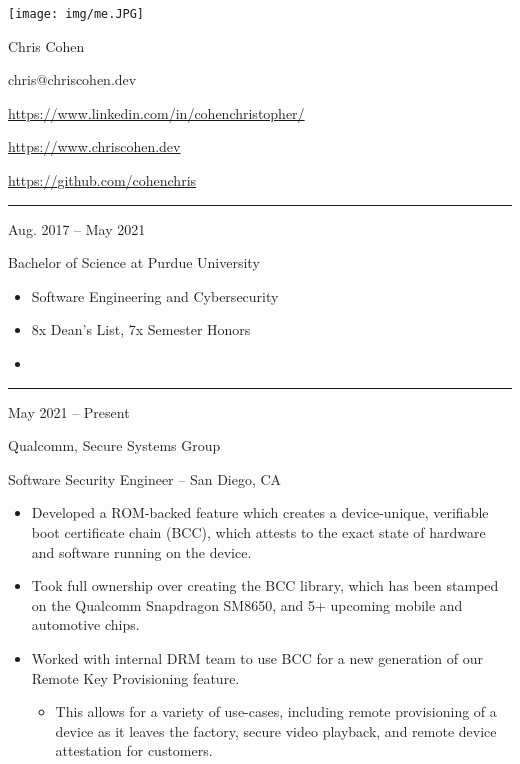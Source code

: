 \documentclass[a4paper]{article}
\newlength{\cvcolumngapwidth}
\newlength{\cvleftcolumnwidth}
\newlength{\cvrightcolumnwidth}
\newcommand{\cvnamestyle}[1]{{\Huge\cvnamefont\textcolor{cvnamecolor}{#1}}}
\newcommand{\cvsectionstyle}[1]{{\normalsize\cvsectionfont\textcolor{cvsectioncolor}{#1}}}
\newcommand{\cvtitlestyle}[1]{{\large\cvtitlefont\textcolor{cvtitlecolor}{#1}}}
\newcommand{\cvdurationstyle}[1]{{\small\cvdurationfont\textcolor{cvdurationcolor}{#1}}}
\newcommand{\italicstyle}[1]{{\small\italicfont\textcolor{cvsectioncolor}{#1}}}
\newlength{\cvafteritemskipamount}
\newlength{\cvaftersectionskipamount}
\newlength{\cvbeforesectionskipamount}
\newlength{\cvafternameskipamount}
\newlength{\cvafterpersonalinfolineskipamount}
\newlength{\cvaftertitleskipamount}
\newlength{\cvparskip}
\newcommand{\cvpersonalinfo}[2]{
    \begin{minipage}[t]{\cvleftcolumnwidth}
        \vspace{0mm} %
        \raggedleft #1
    \end{minipage}%
    \hspace{\cvcolumngapwidth}%
    \begin{minipage}[t]{\cvrightcolumnwidth}
        \vspace{0mm} %
        #2
    \end{minipage}

    \vspace{\cvafteritemskipamount}
}
\newcommand{\cvname}[1]{
    \cvnamestyle{#1}

    \vspace{\cvafternameskipamount}
}
\newcommand{\cvpersonalinfolinewithicon}[3]{
    \raisebox{.5\fontcharht\font`E-.5\height}{\texttt{[image: \#2]}}
    #3

    \vspace{\cvafterpersonalinfolineskipamount}
}
\newcommand{\cvsection}[1]{
    \vspace{\cvbeforesectionskipamount}

    \begin{minipage}[t]{\cvleftcolumnwidth}
        \raggedleft\cvsectionstyle{#1}
    \end{minipage}%
    \hspace{\cvcolumngapwidth}%
    \begin{minipage}[t]{\cvrightcolumnwidth}
        \textcolor{cvrulecolor}{\rule{\cvrightcolumnwidth}{0.3mm}}
    \end{minipage}

    \vspace{\cvaftersectionskipamount}
}
\newcommand{\cvitem}[2]{
    \begin{minipage}[t]{\cvleftcolumnwidth}
        \raggedleft #1
    \end{minipage}%
    \hspace{\cvcolumngapwidth}%
    \begin{minipage}[t]{\cvrightcolumnwidth}
        \setlength{\parskip}{\cvparskip} #2
    \end{minipage}

    \vspace{\cvafteritemskipamount}
}
\newcommand{\cvtitle}[1]{
    \cvtitlestyle{#1}

    \vspace{\cvaftertitleskipamount}
    \vspace{-\cvparskip}
}
\begin{document}

\cvpersonalinfo{
    \texttt{[image: img/me.JPG]}
}{
    \cvname{\textcolor{emphasiscolor}{Chris Cohen}}


    \cvpersonalinfolinewithicon{height=4mm}{img/email.png}{
      chris@chriscohen.dev
    }

    \cvpersonalinfolinewithicon{height=4mm}{img/linkedin.png}{
      \href{https://www.linkedin.com/in/cohenchristopher/}{https://www.linkedin.com/in/cohenchristopher/}
    }

    \cvpersonalinfolinewithicon{height=4mm}{img/website.png}{
      \href{https://www.chriscohen.dev}{https://www.chriscohen.dev}
    }

    \cvpersonalinfolinewithicon{height=4mm}{img/github.png}{
      \href{https://github.com/cohenchris}{https://github.com/cohenchris}
    }
}


\cvsection{\LARGE \textcolor{emphasiscolor}{EDUCATION}}

\cvitem{
    \cvdurationstyle{Aug. 2017 -- May 2021}
}{
  \cvtitle{Bachelor of Science at Purdue University}


    \begin{itemize}[leftmargin=*]
      \item Software Engineering and Cybersecurity
      \item 8x Dean's List, 7x Semester Honors
      \item \large{\regularfont{\textcolor{emphasiscolor}{3.83 GPA}}}
    \end{itemize}
}


\cvsection{\LARGE \textcolor{emphasiscolor}{EXPERIENCE}}

\cvitem{
    \cvdurationstyle{May 2021 -- Present}
}{
    \cvtitle{Qualcomm, Secure Systems Group}

    \italicstyle{Software Security Engineer -- San Diego, CA}

    \normalsize
    \begin{itemize}[leftmargin=*]
      \item Developed a ROM-backed feature which creates a device-unique, verifiable boot certificate chain (BCC), which attests to the exact state of hardware and software running on the device.
      \item Took full ownership over creating the BCC library, which has been stamped on the Qualcomm Snapdragon SM8650, and 5+ upcoming mobile and automotive chips.
      \item Worked with internal DRM team to use BCC for a new generation of our Remote Key Provisioning feature.
        \begin{itemize}
          \item This allows for a variety of use-cases, including remote provisioning of a device as it leaves the factory, secure video playback, and remote device attestation for customers.
        \end{itemize}
    \end{itemize}
}
\end{document}
